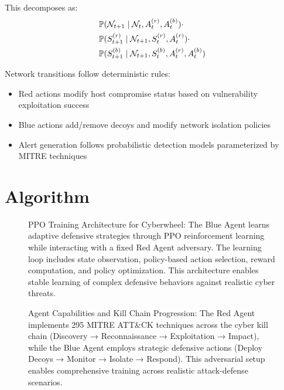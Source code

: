 \documentclass[12pt,twoside]{article}
\theoremstyle{definition}
\theoremstyle{plain}
\begin{document}
This decomposes as:
\begin{align}
&\mathbb{P}(\mathcal{N}_{t+1} \mid \mathcal{N}_t, A_t^{(r)}, A_t^{(b)}) \cdot \\
&\mathbb{P}(S_{t+1}^{(r)} \mid \mathcal{N}_{t+1}, S_t^{(r)}, A_t^{(r)}) \cdot \\
&\mathbb{P}(S_{t+1}^{(b)} \mid \mathcal{N}_{t+1}, S_t^{(b)}, A_t^{(r)}, A_t^{(b)})
\end{align}

Network transitions follow deterministic rules:
\begin{itemize}
    \item Red actions modify host compromise status based on vulnerability exploitation success
    \item Blue actions add/remove decoys and modify network isolation policies
    \item Alert generation follows probabilistic detection models parameterized by MITRE techniques
\end{itemize}

\section{Algorithm}

\begin{figure}[H]
\centering
\caption{PPO Training Architecture for Cyberwheel: The Blue Agent learns adaptive defensive strategies through PPO reinforcement learning while interacting with a fixed Red Agent adversary. The learning loop includes state observation, policy-based action selection, reward computation, and policy optimization. This architecture enables stable learning of complex defensive behaviors against realistic cyber threats.}
\label{fig:ppo_architecture}
\end{figure}

\begin{figure}[H]
\centering
\caption{Agent Capabilities and Kill Chain Progression: The Red Agent implements 295 MITRE ATT\&CK techniques across the cyber kill chain (Discovery → Reconnaissance → Exploitation → Impact), while the Blue Agent employs strategic defensive actions (Deploy Decoys → Monitor → Isolate → Respond). This adversarial setup enables comprehensive training across realistic attack-defense scenarios.}
\label{fig:agent_capabilities}
\end{figure}
\end{document}
